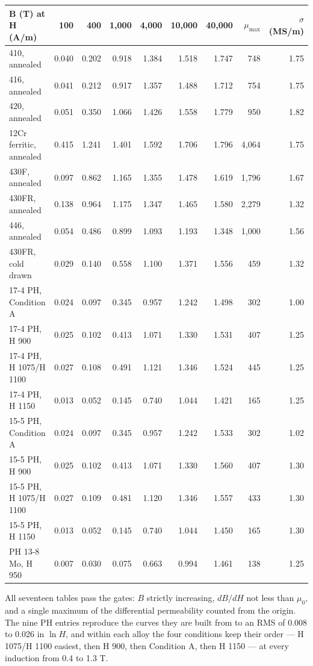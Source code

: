 \documentclass[
  11pt,
]{article}
\begin{document}
\begin{center}
\begin{tabular}{lrrrrrrrr}
\toprule
B (T) at H (A/m) & 100 & 400 & 1,000 & 4,000 & 10,000 & 40,000 & \(\mu_{\max}\) & \(\sigma\) (MS/m) \\
\midrule
410, annealed & 0.040 & 0.202 & 0.918 & 1.384 & 1.518 & 1.747 & 748 & 1.75 \\
416, annealed & 0.041 & 0.212 & 0.917 & 1.357 & 1.488 & 1.712 & 754 & 1.75 \\
420, annealed & 0.051 & 0.350 & 1.066 & 1.426 & 1.558 & 1.779 & 950 & 1.82 \\
12Cr ferritic, annealed & 0.415 & 1.241 & 1.401 & 1.592 & 1.706 & 1.796 & 4,064 & 1.75 \\
430F, annealed & 0.097 & 0.862 & 1.165 & 1.355 & 1.478 & 1.619 & 1,796 & 1.67 \\
430FR, annealed & 0.138 & 0.964 & 1.175 & 1.347 & 1.465 & 1.580 & 2,279 & 1.32 \\
446, annealed & 0.054 & 0.486 & 0.899 & 1.093 & 1.193 & 1.348 & 1,000 & 1.56 \\
430FR, cold drawn & 0.029 & 0.140 & 0.558 & 1.100 & 1.371 & 1.556 & 459 & 1.32 \\
\midrule
17-4 PH, Condition A & 0.024 & 0.097 & 0.345 & 0.957 & 1.242 & 1.498 & 302 & 1.00 \\
17-4 PH, H 900 & 0.025 & 0.102 & 0.413 & 1.071 & 1.330 & 1.531 & 407 & 1.25 \\
17-4 PH, H 1075/H 1100 & 0.027 & 0.108 & 0.491 & 1.121 & 1.346 & 1.524 & 445 & 1.25 \\
17-4 PH, H 1150 & 0.013 & 0.052 & 0.145 & 0.740 & 1.044 & 1.421 & 165 & 1.25 \\
15-5 PH, Condition A & 0.024 & 0.097 & 0.345 & 0.957 & 1.242 & 1.533 & 302 & 1.02 \\
15-5 PH, H 900 & 0.025 & 0.102 & 0.413 & 1.071 & 1.330 & 1.560 & 407 & 1.30 \\
15-5 PH, H 1075/H 1100 & 0.027 & 0.109 & 0.481 & 1.120 & 1.346 & 1.557 & 433 & 1.30 \\
15-5 PH, H 1150 & 0.013 & 0.052 & 0.145 & 0.740 & 1.044 & 1.450 & 165 & 1.30 \\
PH 13-8 Mo, H 950 & 0.007 & 0.030 & 0.075 & 0.663 & 0.994 & 1.461 & 138 & 1.25 \\
\bottomrule
\end{tabular}
\end{center}

All seventeen tables pass the gates: \(B\) strictly increasing, \(dB/dH\) not less than \(\mu_0\), and a single maximum of the differential permeability counted from the origin. The nine PH entries reproduce the curves they are built from to an RMS of 0.008 to 0.026 in \(\ln H\), and within each alloy the four conditions keep their order --- H 1075/H 1100 easiest, then H 900, then Condition A, then H 1150 --- at every induction from 0.4 to 1.3 T.
\end{document}
